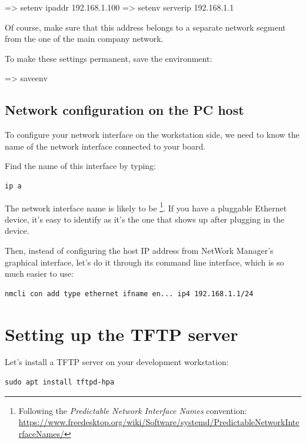 \begin{ubootinput}
=> setenv ipaddr 192.168.1.100
=> setenv serverip 192.168.1.1
\end{ubootinput}

Of course, make sure that this address belongs to a separate network
segment from the one of the main company network.

To make these settings permanent, save the environment:

\begin{ubootinput}
=> saveenv
\end{ubootinput}

\subsection{Network configuration on the PC host}

To configure your network interface on the workstation side, we need
to know the name of the network interface connected to your board.

Find the name of this interface by typing:

\begin{verbatim}
ip a
\end{verbatim}

The network interface name is likely to be
\footnote{Following the {\em Predictable Network Interface
Names} convention:
\url{https://www.freedesktop.org/wiki/Software/systemd/PredictableNetworkInterfaceNames/}}.
If you have a pluggable Ethernet device, it's easy to identify as it's
the one that shows up after plugging in the device.

Then, instead of configuring the host IP address from NetWork Manager's
graphical interface, let's do it through its command line interface,
which is so much easier to use:

\begin{verbatim}
nmcli con add type ethernet ifname en... ip4 192.168.1.1/24
\end{verbatim}

\section{Setting up the TFTP server}

Let's install a TFTP server on your development workstation:

\begin{verbatim}
sudo apt install tftpd-hpa
\end{verbatim}

